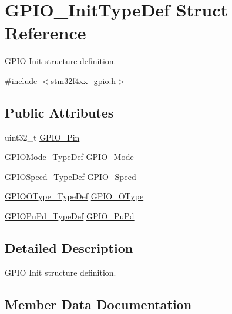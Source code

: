 \hypertarget{struct_g_p_i_o___init_type_def}{}\section{G\+P\+I\+O\+\_\+\+Init\+Type\+Def Struct Reference}
\label{struct_g_p_i_o___init_type_def}


G\+P\+IO Init structure definition.  




{\ttfamily \#include $<$stm32f4xx\+\_\+gpio.\+h$>$}

\subsection*{Public Attributes}
\begin{DoxyCompactItemize}
\item 
uint32\+\_\+t \hyperlink{struct_g_p_i_o___init_type_def_a0beb7bf54bbf5fff56f49d8beba2e3df}{G\+P\+I\+O\+\_\+\+Pin}
\item 
\hyperlink{group___g_p_i_o_ga1347339e1c84a196fabbb31205eec5d4}{G\+P\+I\+O\+Mode\+\_\+\+Type\+Def} \hyperlink{struct_g_p_i_o___init_type_def_a55bd77e335c2bfeec9caa5dc922b791b}{G\+P\+I\+O\+\_\+\+Mode}
\item 
\hyperlink{group___g_p_i_o_ga062ad92b67b4a1f301c161022cf3ba8e}{G\+P\+I\+O\+Speed\+\_\+\+Type\+Def} \hyperlink{struct_g_p_i_o___init_type_def_ac05832cacebc861a9acf5294d702c16b}{G\+P\+I\+O\+\_\+\+Speed}
\item 
\hyperlink{group___g_p_i_o_gae74212e8d66c389f47326b06bdf6d2ab}{G\+P\+I\+O\+O\+Type\+\_\+\+Type\+Def} \hyperlink{struct_g_p_i_o___init_type_def_af48c56f3e56e71204c8904ea29f5181b}{G\+P\+I\+O\+\_\+\+O\+Type}
\item 
\hyperlink{group___g_p_i_o_gafb7ecd99c44b4fd702d669304a36c2c8}{G\+P\+I\+O\+Pu\+Pd\+\_\+\+Type\+Def} \hyperlink{struct_g_p_i_o___init_type_def_aad62942c003bc2083d37f10f6f39bd5f}{G\+P\+I\+O\+\_\+\+Pu\+Pd}
\end{DoxyCompactItemize}


\subsection{Detailed Description}
G\+P\+IO Init structure definition. 

\subsection{Member Data Documentation}
